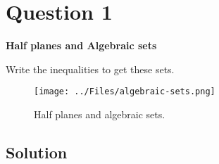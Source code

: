 \section*{Question 1}

\textbf{Half planes and Algebraic sets}

Write the inequalities to get these sets.

\begin{figure}[htbp]
    \centering
    \texttt{[image: ../Files/algebraic-sets.png]}
    \vspace*{-2em}
    \caption{
        Half planes and algebraic sets.
    }\label{fig:q1}
\end{figure}

\subsection*{Solution}
